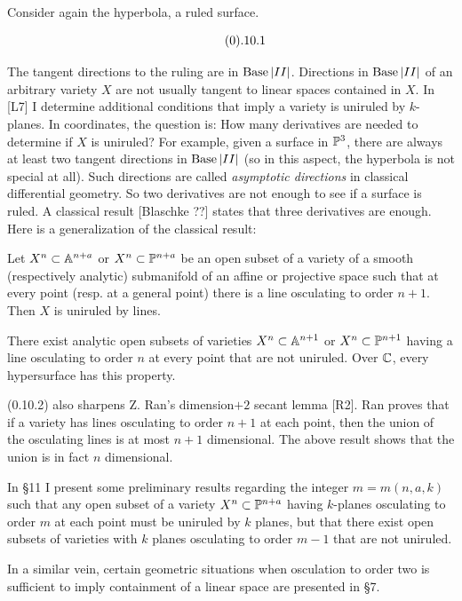 Consider again the hyperbola, a ruled surface.

$$
 \ \tag 0.10.1
$$

 The tangent directions to
the ruling are in $\text{Base}\,| II |$. 
Directions in $\text{Base}\,| II |$ of an arbitrary
variety $X$ are not usually tangent to linear spaces contained
in $X$. In [L7] I determine
  additional conditions that imply 
a variety
is   uniruled by $k$-planes.
In coordinates, 
the question is:  How many 
derivatives are needed  to determine if $X$ is
uniruled?  For example, given a
surface in $\Bbb P^3$,   there are always at least two tangent directions
in
$\text{Base}\,| II |$ (so in this aspect, the hyperbola is
not special at all).
Such directions are called {\it
asymptotic directions} in classical differential 
geometry.  So two derivatives are   not enough to see if a
surface is ruled. A classical result [Blaschke ??] states that   three
derivatives are enough. Here is a  generalization of the classical result:



Let $X^n\subset\Bbb A^{n+a}$ or $X^n\subset\Bbb P^{n+a}$ be an open subset of a
variety  of a smooth (respectively analytic)
submanifold of an affine or projective space
such that at every point
(resp. at a general point) there is a line osculating to order $n+1$.
Then $X$ is uniruled by lines.

  There exist analytic 
open subsets of varieties $X^n\subset\Bbb A^{n+1}$ or $X^n\subset\Bbb P^{n+1}$ 
having a line osculating to order $n$ at every point that are not uniruled.
Over $\Bbb C$, every hypersurface has this property.   
\endproclaim

(0.10.2) also sharpens Z. Ran's dimension$+2$ secant lemma [R2]. Ran  
proves
that if a variety has lines osculating to order $n+1$ at each point, then
the union of the osculating lines is at most $n+1$ dimensional. The
above result shows that the union is in fact $n$ dimensional.




 In \S 11 I present some preliminary results 
regarding the integer $m=m(n,a,k)$
such that any open subset of a variety  $X^n\subset\Bbb P^{n+a}$ having
$k$-planes
osculating to order $m$ at each point must be uniruled
by $k$ planes, but that there exist open subsets of   varieties with $k$
planes osculating to order $m-1$ that are not uniruled.
 
In a similar vein,   certain geometric situations when
osculation to order two is sufficient to imply containment of a linear
space are presented in \S 7.  


